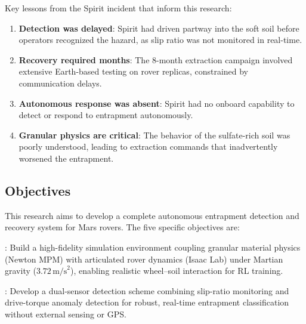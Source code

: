 \documentclass[12pt,a4paper]{article}
\begin{document}
Key lessons from the Spirit incident that inform this research:
\begin{enumerate}
    \item \textbf{Detection was delayed}: Spirit had driven partway into the soft soil before operators recognized the hazard, as slip ratio was not monitored in real-time.
    \item \textbf{Recovery required months}: The 8-month extraction campaign involved extensive Earth-based testing on rover replicas, constrained by communication delays.
    \item \textbf{Autonomous response was absent}: Spirit had no onboard capability to detect or respond to entrapment autonomously.
    \item \textbf{Granular physics are critical}: The behavior of the sulfate-rich soil was poorly understood, leading to extraction commands that inadvertently worsened the entrapment.
\end{enumerate}

\newpage
\subsection{Objectives}

This research aims to develop a complete autonomous entrapment detection and recovery system for Mars rovers. The five specific objectives are:


\vspace{6pt}
\begin{tcolorbox}[objbox, colframe=headerblue, title={1.\enspace Realistic Simulation}]
: Build a high-fidelity simulation environment coupling granular material physics (Newton MPM)
with articulated rover dynamics (Isaac Lab) under Martian gravity ($3.72\,\text{m/s}^2$),
enabling realistic wheel--soil interaction for RL training.
\end{tcolorbox}

\vspace{4pt}
\begin{tcolorbox}[objbox, colframe=headerblue, title={2.\enspace Entrapment Detection}]
: Develop a dual-sensor detection scheme combining slip-ratio monitoring and drive-torque
anomaly detection for robust, real-time entrapment classification without external
sensing or GPS.
\end{tcolorbox}
\end{document}
